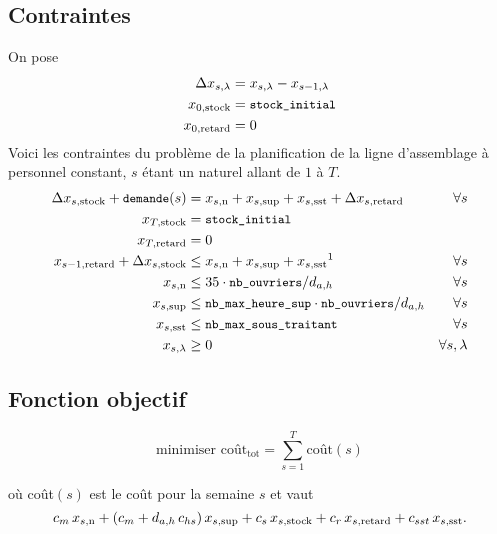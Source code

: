 \subsection*{Contraintes}
On pose
\begin{align*}
\Delta x_{s,\lambda} &= x_{s,\lambda} - x_{s-1,\lambda} \\
x_{0,\text{stock}} &= {\small\texttt{stock\_initial}} \\
x_{0,\text{retard}}&= 0
\end{align*}
Voici les contraintes du problème de la planification 
de la ligne d’assemblage à personnel constant, $s$ étant un naturel allant de $1$ à $T$.
\begin{align*}
  \Delta\xstock + \texttts{demande}(s) &= \xn + \xsup
   + \xsst + \Delta\xretard &\forall s \\
  \myX{T}{stock} &= \texttts{stock\_initial} \\
  \myX{T}{retard}&= 0 \\
  \myX{s-1}{retard} + \Delta\xstock &\leq \xn + \xsup + \xsst \text{\footnotemark} &\forall s \\
  \xn &\leq 35\cdot \texttts{nb\_ouvriers}/ d_{a,h}
  &\forall s \\
  \xsup &\leq \texttts{nb\_max\_heure\_sup}\cdot\texttts{nb\_ouvriers}/ d_{a,h}
  &\forall s \\
  \xsst &\leq \texttts{nb\_max\_sous\_traitant} &\forall s \\
  x_{s,\lambda} &\geq 0 &\forall s,\lambda \\
\end{align*}

\subsection*{Fonction objectif}
\[ \text{minimiser } \text{coût}_\text{tot} = \sum_{s=1}^{T} \text{coût}(s) \]

où coût$(s)$ est le coût pour la semaine $s$ et vaut $$c_m\, x_{s,\text{n}} + (c_m + d_{a,h} \, c_{hs})\, x_{s,\text{sup}}
  + c_s\, x_{s,\text{stock}} + c_r\, x_{s,\text{retard}} + c_{sst}\, x_{s,\text{sst}}.$$

